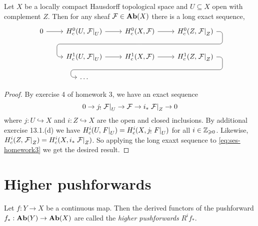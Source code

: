 \documentclass[../main.tex]{subfiles}
\begin{document}
\begin{lem}
    Let $X$ be a locally compact Hausdorff topological space and $U\subseteq X$ open with complement $Z$. Then for any sheaf $\mathcal{F} \in \mathbf{Ab}(X)$ there is a long exact sequence,
    \[\begin{tikzcd}
            0 \ar[r] & H^0_c(U, \restr{\sh F}{U}) \ar[r] & H^0_c(X, \sh F) \ar[r] \ar[draw=none]{d}[name=X, anchor=center]{} & H^0_c(Z, \restr{\sh F}{Z})
            \ar[rounded corners,
            to path={ -- ([xshift=2ex]\tikztostart.east)
                      |- (X.center) \tikztonodes
                      -| ([xshift=-2ex]\tikztotarget.west)
                      -- (\tikztotarget)}]{dll}[at end]{} \\
            & H^1_c(U, \restr{\sh F}{U}) \ar[r] & H^1_c(X, \sh F) \ar[r] \ar[draw=none]{d}[name=Y, anchor=center]{} & H^1_c(Z, \restr{\sh F}{Z})
            \ar[rounded corners,
            to path={ -- ([xshift=2ex]\tikztostart.east)
                      |- (Y.center) \tikztonodes
                      -| ([xshift=-2ex]\tikztotarget.west)
                      -- (\tikztotarget)}]{dll}[at end]{} \\
            & \dots & {} & {}
    \end{tikzcd}\]
\end{lem}
\begin{proof}
    By exercise 4 of homework 3, we have an exact sequence 
    \begin{equation}\label{eq:ses-homework3}
        0 \to j_{!} \left.\mathcal{F}\right|_{U} \to \mathcal{F} \to i_*\left.\mathcal{F}\right|_{Z} \to 0
    \end{equation}
     where $j\colon U\hookrightarrow X$ and $i\colon Z\hookrightarrow X$ are the open and closed inclusions. By additional exercise 13.1.(d) we have
    $H^i_c(U, \left.F\right|_{U}) = H^i_c(X, j_{!}\left.F\right|_{U})$ for all $i\in \mathbb{Z}_{\geqslant 0}$. Likewise, $H^i_c(Z, \left.\mathcal{F}\right|_{Z}) = H^i_c(X, i_* \left.\mathcal{F}\right|_{Z})$. So applying the long exaxt sequence to \ref{eq:ses-homework3} we get the desired result.
\end{proof}


\section{Higher pushforwards}

\begin{defn}
    Let $f\colon Y \to X$ be a continuous map.
    Then the derived functors of the pushforward $f_*\colon \catAbelianGroup(Y) \to \catAbelianGroup(X)$ are called the \emph{higher pushforwards} $R^i f_*$. 
\end{defn}
\end{document}
